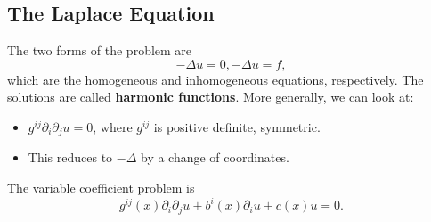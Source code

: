 \documentclass[12pt]{scrartcl}
\begin{document}
\subsection{The Laplace Equation}
The two forms of the problem are
$$-\Delta u = 0, -\Delta u = f,$$
which are the homogeneous and inhomogeneous equations, respectively.  The solutions are called \textbf{harmonic functions}.  More generally, we can look at:
\begin{itemize}
\item $g^{ij}\partial_i \partial_j u = 0$, where $g^{ij}$ is positive definite, symmetric.  
\item This reduces to $-\Delta$ by a change of coordinates.
\end{itemize}
The variable coefficient problem is 
$$g^{ij}(x) \partial_i \partial_j u + b^{i}(x)\partial_i u + c(x) u = 0.$$
\end{document}
